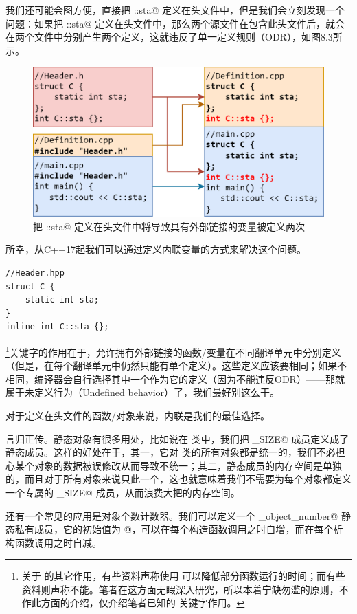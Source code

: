 我们还可能会图方便，直接把 \lstinline@C::sta@ 定义在头文件中，但是我们会立刻发现一个问题：如果把 \lstinline@C::sta@ 定义在头文件中，那么两个源文件在包含此头文件后，就会在两个文件中分别产生两个定义，这就违反了单一定义规则（ODR），如图8.3所示。\par
\begin{figure}[htbp]
    \centering
    \includegraphics[width=.8\textwidth]{../images/generalized_parts/08_file_inclusion.drawio.png}
    \caption{把 \lstinline@C::sta@ 定义在头文件中将导致具有外部链接的变量被定义两次}
\end{figure}
所幸，从C++17起我们可以通过定义内联变量的方式来解决这个问题。
\begin{lstlisting}
//Header.hpp
struct C {
    static int sta;
}
inline int C::sta {};
\end{lstlisting}
\lstinline@inline@\footnote{关于 \lstinline@inline@ 的其它作用，有些资料声称使用 \lstinline@inline@ 可以降低部分函数运行的时间；而有些资料则声称不能。笔者在这方面无睱深入研究，所以本着宁缺勿滥的原则，不作此方面的介绍，仅介绍笔者已知的 \lstinline@inline@ 关键字作用。}关键字的作用在于，允许拥有外部链接的函数/变量在不同翻译单元中分别定义（但是，在每个翻译单元中仍然只能有单个定义）。这些定义应该要相同；如果不相同，编译器会自行选择其中一个作为它的定义（因为不能违反ODR）——那就属于未定义行为（Undefined behavior）了，我们最好别这么干。\par
对于定义在头文件的函数/对象来说，内联是我们的最佳选择。\par
言归正传。静态对象有很多用处，比如说在 \lstinline@valarray@ 类中，我们把 \lstinline@MAX_SIZE@ 成员定义成了静态成员。这样的好处在于，其一，它对 \lstinline@valarri@ 类的所有对象都是统一的，我们不必担心某个对象的数据被误修改从而导致不统一；其二，静态成员的内存空间是单独的，而且对于所有对象来说只此一个，这也就意味着我们不需要为每个对象都定义一个专属的 \lstinline@MAX_SIZE@ 成员，从而浪费大把的内存空间。\par
还有一个常见的应用是对象个数计数器。我们可以定义一个 \lstinline@_object_number@ 静态私有成员，它的初始值为 @，可以在每个构造函数调用之时自增，而在每个析构函数调用之时自减。
